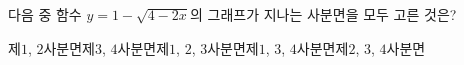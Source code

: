 \hspace*{2mm}\begin{minipage}[t]{\dimexpr\linewidth-2mm\relax}\vspace{0pt}
다음 중 함수 $y=1-\sqrt{4-2x}$의 그래프가 지나는 사분면을 모두 고른 것은?
\begin{choicesii}{제$1$, $2$사분면}{제$3$, $4$사분면}{제$1$, $2$, $3$사분면}{제$1$, $3$, $4$사분면}{제$2$, $3$, $4$사분면}\end{choicesii}\end{minipage}

